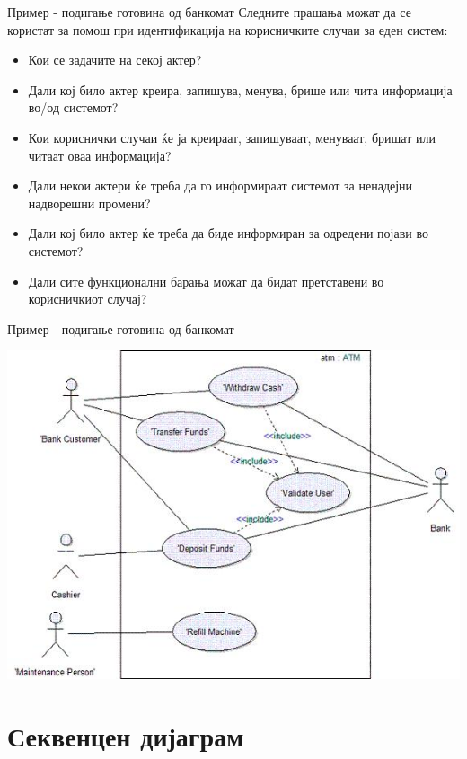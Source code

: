 \begin{frame}{Пример - подигање готовина од банкомат}
Следните прашања можат да се користат за помош при идентификација на
корисничките случаи за еден систем:
\begin{itemize}
  \item Кои се задачите на секој актер?
  \item Дали кој било актер креира, запишува, менува, брише или чита информација
  во/од системот?
  \item Кои кориснички случаи ќе ја креираат, запишуваат, менуваат, бришат или
  читаат оваа информација?
  \item Дали некои актери ќе треба да го информираат системот за ненадејни
  надворешни промени?
  \item Дали кој било актер ќе треба да биде информиран за одредени појави во
  системот?
  \item Дали сите функционални барања можат да бидат претставени во корисничкиот
  случај?
\end{itemize}
\end{frame}
    
    
\begin{frame}{Пример - подигање готовина од банкомат}
\begin{center}
    \includegraphics[scale=0.4]{images/atm_usecase.jpg}
\end{center}
\end{frame}

\section{Секвенцен дијаграм}

